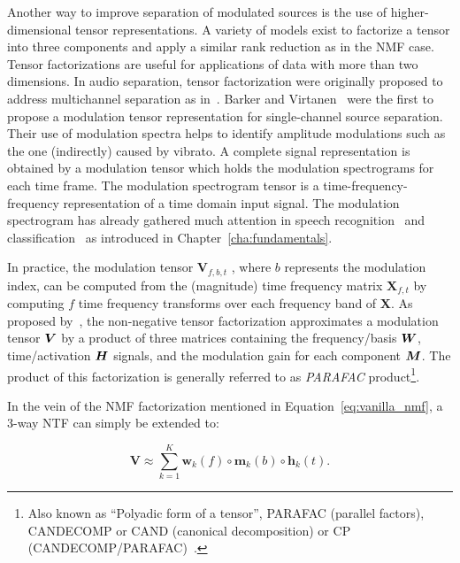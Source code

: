 
Another way to improve separation of modulated sources is the use of higher-dimensional tensor representations.
A variety of models exist to factorize a tensor into three components and apply a similar rank reduction as in the NMF case.
Tensor factorizations are useful for applications of data with more than two dimensions.
In audio separation, tensor factorization were originally proposed to address multichannel separation as in~\cite{fitzgerald08, fevotte10, ozerov11}. 
Barker and Virtanen~\cite{barker13} were the first to propose a modulation tensor representation for single-channel source separation. 
Their use of modulation spectra helps to identify amplitude modulations such as the one (indirectly) caused by vibrato. 
A complete signal representation is obtained by a modulation tensor which holds the modulation spectrograms for each time frame.
The modulation spectrogram tensor is a time-frequency-frequency representation of a time domain input signal.
The modulation spectrogram has already gathered much attention in speech recognition~\cite{greenberg97, kingsbury98} and classification~\cite{kinnunen08, markaki09} as introduced in Chapter~\ref{cha:fundamentals}.
\par
In practice, the modulation tensor \(\mathbf{V}_{f, b, t}\) , where \(b\) represents the modulation index, can be computed from the (magnitude) time frequency matrix \(\mathbf{X}_{f, t}\) by computing \(f\) time frequency transforms over each frequency band of \(\mathbf{X}\).
As proposed by~\cite{barker13}, the non-negative tensor factorization approximates a modulation tensor \({\bm{V}}\) by a product of three matrices containing the frequency/basis \({\bm{W}}\), time/activation \({\bm{H}}\) signals, and the modulation gain for each component \({\bm{M}}\).
The product of this factorization is generally referred to as \emph{PARAFAC} product\footnote{Also known as ``Polyadic form of a tensor'', PARAFAC (parallel factors), CANDECOMP or CAND (canonical decomposition) or CP (CANDECOMP/PARAFAC)~\cite{kolda09}.}.

In the vein of the NMF factorization mentioned in Equation~\ref{eq:vanilla_nmf}, a 3-way NTF can simply be extended to:

\begin{equation}
   \mathbf{V} \approx \sum\limits_{k=1}^{K} \mathbf{w}_{k}(f) \circ \mathbf{m}_{k}(b) \circ \mathbf{h}_{k}(t).
\end{equation}

